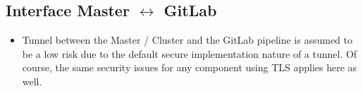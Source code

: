 \subsection{Interface Master \(\leftrightarrow\) GitLab}
\begin{itemize}
    \item Tunnel between the Master / Cluster and the GitLab pipeline is assumed to be a low risk due to the default secure implementation nature of a tunnel. Of course, the same security issues for any component using TLS applies here as well.
\end{itemize}

